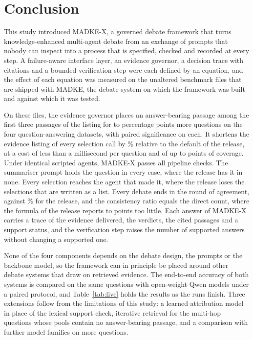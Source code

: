 \section{Conclusion}
\label{sec:conclusion}

This study introduced MADKE-X, a governed debate framework that turns knowledge-enhanced multi-agent debate from an exchange of prompts that nobody can inspect into a process that is specified, checked and recorded at every step. A failure-aware interface layer, an evidence governor, a decision trace with citations and a bounded verification step were each defined by an equation, and the effect of each equation was measured on the unaltered benchmark files that are shipped with MADKE, the debate system on which the framework was built and against which it was tested.

On these files, the evidence governor places an answer-bearing passage among the first three passages of the listing for \VGainMin{} to \VGainMax{} percentage points more questions on the four question-answering datasets, with paired significance on each. It shortens the evidence listing of every selection call by \VTokRedMean\% relative to the default of the release, at a cost of less than a millisecond per question and of up to \VCoverLossMax{} points of coverage. Under identical scripted agents, MADKE-X passes all \VInvChecksAll{} pipeline checks. The summariser prompt holds the question in every case, where the release has it in none. Every selection reaches the agent that made it, where the release loses the \VSetBadRel{} selections that are written as a list. Every debate ends in the round of agreement, against \VStopPctRel\% for the release, and the consistency ratio equals the direct count, where the formula of the release reports \VConsGapMin{} to \VConsGapMax{} points too little. Each answer of MADKE-X carries a trace of the evidence delivered, the verdicts, the cited passages and a support status, and the verification step raises the number of supported answers without changing a supported one.

None of the four components depends on the debate design, the prompts or the backbone model, so the framework can in principle be placed around other debate systems that draw on retrieved evidence. The end-to-end accuracy of both systems is compared on the same questions with open-weight Qwen models under a paired protocol, and Table~\ref{tab:live} holds the results as the runs finish. Three extensions follow from the limitations of this study: a learned attribution model in place of the lexical support check, iterative retrieval for the multi-hop questions whose pools contain no answer-bearing passage, and a comparison with further model families on more questions.
